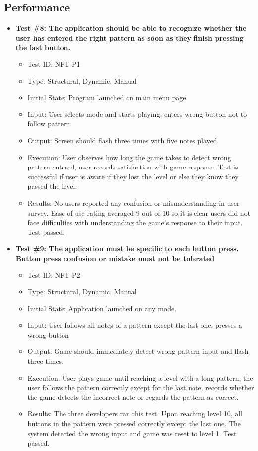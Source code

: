 \documentclass[12pt, titlepage]{article}
\begin{document}
\subsection{Performance}
\begin{itemize}
\item \textbf{Test \#8: The application should be able to recognize whether the user has entered the right pattern as soon as they finish pressing the last button.}
\begin{itemize}
\item Test ID: NFT-P1
\item Type: Structural, Dynamic, Manual				
\item Initial State: Program launched on main menu page		
\item Input: User selects mode and starts playing, enters wrong button not to follow pattern.
\item Output: Screen should flash three times with five notes played.		
\item Execution: User observes how long the game takes to detect wrong pattern entered, user records satisfaction with game response. Test is successful if user is aware if they lost the level or else they know they passed the level.
\item Results: No users reported any confusion or misunderstanding in user survey. Ease of use rating averaged 9 out of 10 so it is clear users did not face difficulties with understanding the game's response to their input. Test passed.
\end{itemize}

\item \textbf{Test \#9: The application must be specific to each button press. Button press confusion or mistake must not be tolerated}
\begin{itemize}
\item Test ID: NFT-P2
\item Type: Structural, Dynamic, Manual			
\item Initial State: Application launched on any mode.			
\item Input: User follows all notes of a pattern except the last one, presses a wrong button			
\item Output: Game should immediately detect wrong pattern input and flash three times.				
\item Execution: User plays game until reaching a level with a long pattern, the user follows the pattern correctly except for the last note, records whether the game detects the incorrect note or regards the pattern as correct.
\item Results: The three developers ran this test. Upon reaching level 10, all buttons in the pattern were pressed correctly except the last one. The system detected the wrong input and game was reset to level 1. Test passed.
\end{itemize}


\end{itemize}
\end{document}
